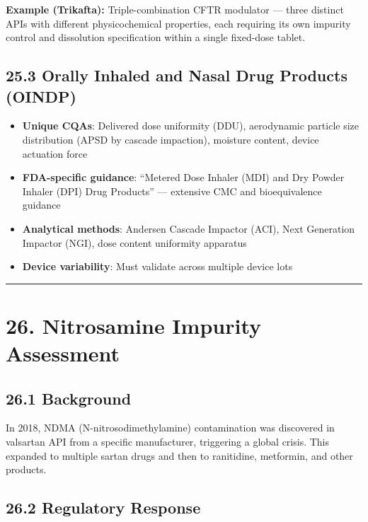 \documentclass[
  11pt,
  a4paper,
]{report}
\providecommand{\tightlist}{%
  \setlength{\itemsep}{0pt}\setlength{\parskip}{0pt}}
\begin{document}
\textbf{Example (Trikafta):} Triple-combination CFTR modulator --- three
distinct APIs with different physicochemical properties, each requiring
its own impurity control and dissolution specification within a single
fixed-dose tablet.

\hypertarget{orally-inhaled-and-nasal-drug-products-oindp}{%
\subsection{25.3 Orally Inhaled and Nasal Drug Products
(OINDP)}\label{orally-inhaled-and-nasal-drug-products-oindp}}

\begin{itemize}
\tightlist
\item
  \textbf{Unique CQAs}: Delivered dose uniformity (DDU), aerodynamic
  particle size distribution (APSD by cascade impaction), moisture
  content, device actuation force
\item
  \textbf{FDA-specific guidance}: ``Metered Dose Inhaler (MDI) and Dry
  Powder Inhaler (DPI) Drug Products'' --- extensive CMC and
  bioequivalence guidance
\item
  \textbf{Analytical methods}: Andersen Cascade Impactor (ACI), Next
  Generation Impactor (NGI), dose content uniformity apparatus
\item
  \textbf{Device variability}: Must validate across multiple device lots
\end{itemize}

\begin{center}\rule{0.5\linewidth}{0.5pt}\end{center}

\hypertarget{nitrosamine-impurity-assessment}{%
\section{26. Nitrosamine Impurity
Assessment}\label{nitrosamine-impurity-assessment}}

\hypertarget{background}{%
\subsection{26.1 Background}\label{background}}

In 2018, NDMA (N-nitrosodimethylamine) contamination was discovered in
valsartan API from a specific manufacturer, triggering a global crisis.
This expanded to multiple sartan drugs and then to ranitidine,
metformin, and other products.

\hypertarget{regulatory-response}{%
\subsection{26.2 Regulatory Response}\label{regulatory-response}}
\end{document}
